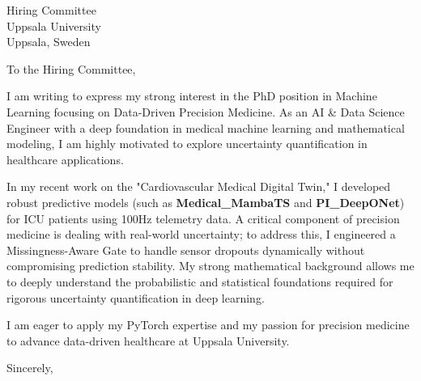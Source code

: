 \documentclass[11pt,a4paper]{letter}
\begin{document}
\begin{letter}{
    Hiring Committee \\
    Uppsala University \\
    Uppsala, Sweden
}
\opening{To the Hiring Committee,}

I am writing to express my strong interest in the PhD position in Machine Learning focusing on Data-Driven Precision Medicine. As an AI \& Data Science Engineer with a deep foundation in medical machine learning and mathematical modeling, I am highly motivated to explore uncertainty quantification in healthcare applications.

In my recent work on the "Cardiovascular Medical Digital Twin," I developed robust predictive models (such as \textbf{Medical\_MambaTS} and \textbf{PI\_DeepONet}) for ICU patients using 100Hz telemetry data. A critical component of precision medicine is dealing with real-world uncertainty; to address this, I engineered a Missingness-Aware Gate to handle sensor dropouts dynamically without compromising prediction stability. My strong mathematical background allows me to deeply understand the probabilistic and statistical foundations required for rigorous uncertainty quantification in deep learning.

I am eager to apply my PyTorch expertise and my passion for precision medicine to advance data-driven healthcare at Uppsala University.

\closing{Sincerely,}
\end{letter}
\end{document}
